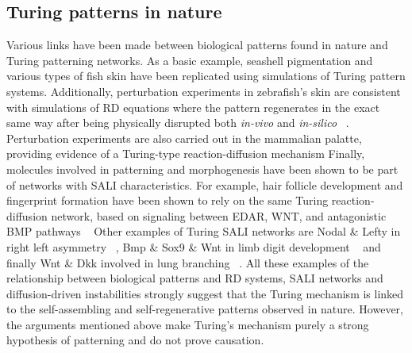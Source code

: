 
\subsection{Turing patterns in nature}\label{Turing patterns in nature}
Various links have been made between biological patterns found in nature and Turing patterning networks.
As a basic example, seashell pigmentation and various types of fish skin have been replicated using simulations of Turing pattern systems.
Additionally, perturbation experiments in zebrafish’s skin are consistent with simulations of RD equations where the pattern regenerates in the exact same way after being physically disrupted both \textit{in-vivo} and \textit{in-silico} ~\parencite{Kondo2010a}.
Perturbation experiments are also carried out in the mammalian palatte, providing evidence of a Turing-type reaction-diffusion mechanism %
Finally, molecules involved in patterning and morphogenesis have been shown to be part of networks with SALI characteristics.
For example, hair follicle development and fingerprint formation have been shown to rely on the same Turing reaction-diffusion network, based on signaling between EDAR, WNT, and antagonistic BMP pathways ~\parencite{Glover2023}
Other examples of Turing SALI networks are Nodal \& Lefty in right left asymmetry ~\parencite{Nakamura2006}, Bmp \& Sox9 \& Wnt in limb digit development ~\parencite{Raspopovic1} and finally Wnt \& Dkk involved in lung branching ~\parencite{langhe2005_lung}.
All these examples of the relationship between biological patterns and RD systems, SALI networks and diffusion-driven instabilities strongly suggest that the Turing mechanism is linked to the self-assembling and self-regenerative patterns observed in nature.
However, the arguments mentioned above make Turing’s mechanism purely a strong hypothesis of patterning and do not prove causation.


